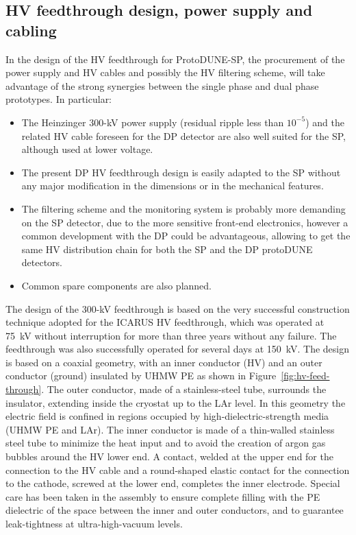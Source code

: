 
\subsection{HV feedthrough design, power supply and cabling}
In the design of the HV feedthrough for ProtoDUNE-SP, the procurement of the power supply and HV cables and possibly the HV filtering scheme, will take advantage of the strong synergies between the single phase and dual phase prototypes. In particular:

\begin{itemize}	
\item The Heinzinger 300-kV power supply (residual ripple less than $10^{-5}$) and the related HV cable foreseen for the DP detector are also well suited for the SP, although used at lower voltage.
\item The present DP HV feedthrough design is easily adapted to the SP without any major modification in the dimensions or in the mechanical features.
\item The filtering scheme and the monitoring system is probably more demanding on the SP detector, due to the more sensitive front-end electronics, however a common development with the DP could be advantageous, allowing to get the same HV distribution chain for both the SP and the DP protoDUNE detectors.
\item Common spare components are also planned. %
\end{itemize}

The %
design of the 300-kV feedthrough is based on the very successful construction technique adopted for the ICARUS HV feedthrough, which was operated at 75~kV without interruption for more than three years without any failure. The feedthrough was also successfully operated for several days at 150~kV.  
The design is based on a coaxial geometry, with an inner conductor (HV) and an outer conductor (ground) insulated by UHMW PE  as shown in Figure~\ref{fig:hv-feed-through}. The outer conductor, made of a stainless-steel tube, surrounds the insulator, extending inside the cryostat up to the LAr level. %
In this geometry the electric field is %
confined in regions occupied by high-dielectric-strength media (UHMW PE and LAr).  The inner conductor is made of a thin-walled stainless steel tube to minimize the heat input and to avoid the creation of argon gas bubbles around the HV lower end. A contact, welded at the upper end for the
connection to the HV cable and a round-shaped elastic contact for the connection to the cathode, screwed at the lower end, completes the inner electrode. Special care has been taken in the assembly to ensure complete filling with the PE dielectric of the space between the inner and outer conductors, and to guarantee leak-tightness at ultra-high-vacuum levels.

